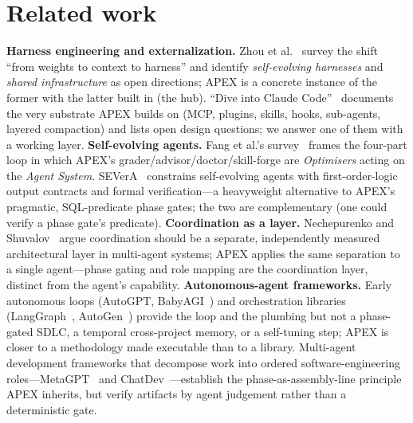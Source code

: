 \documentclass[sigconf,review,anonymous=false]{acmart}
\begin{document}
\section{Related work}
\textbf{Harness engineering and externalization.} Zhou et
al.~\cite{zhou2026external} survey the shift ``from weights to context to harness''
and identify \emph{self-evolving harnesses} and \emph{shared infrastructure} as
open directions; APEX is a concrete instance of the former with the latter built in
(the hub). ``Dive into Claude Code''~\cite{liu2026divecc} documents the very
substrate APEX builds on (MCP, plugins, skills, hooks, sub-agents, layered
compaction) and lists open design questions; we answer one of them with a
working layer.
\textbf{Self-evolving agents.} Fang et al.'s survey~\cite{fang2025selfevolve}
frames the four-part loop in which APEX's grader/advisor/doctor/skill-forge are
\emph{Optimisers} acting on the \emph{Agent System}. SEVerA~\cite{banerjee2026severa}
constrains self-evolving agents with first-order-logic output contracts and formal
verification---a heavyweight alternative to APEX's pragmatic, SQL-predicate phase
gates; the two are complementary (one could verify a phase gate's predicate).
\textbf{Coordination as a layer.} Nechepurenko and
Shuvalov~\cite{nechepurenko2026coord} argue coordination should be a separate,
independently measured architectural layer in multi-agent systems; APEX applies the
same separation to a single agent---phase gating and role mapping are the
coordination layer, distinct from the agent's capability.
\textbf{Autonomous-agent frameworks.} Early autonomous loops (AutoGPT,
BabyAGI~\cite{autogpt2023,babyagi2023}) and orchestration libraries
(LangGraph~\cite{langgraph2024}, AutoGen~\cite{wu2023autogen}) provide the loop and
the plumbing but not a phase-gated SDLC, a temporal cross-project memory, or a
self-tuning step; APEX is closer to a methodology made executable than to a library.
Multi-agent development frameworks that decompose work into ordered
software-engineering roles---MetaGPT~\cite{hong2023metagpt} and
ChatDev~\cite{qian2023chatdev}---establish the phase-as-assembly-line principle APEX
inherits, but verify artifacts by agent judgement rather than a deterministic gate.
\end{document}
